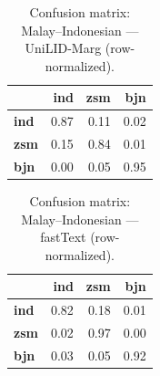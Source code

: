 \begin{table}[htbp]
\centering
\small
\begin{tabular}{lrrr}
\toprule
 & \textbf{ind} & \textbf{zsm} & \textbf{bjn} \\
\midrule
\textbf{ind} & \cellcolor{blue!87}\color{white}0.87 & \cellcolor{blue!10}0.11 & \cellcolor{blue!1}0.02 \\
\textbf{zsm} & \cellcolor{blue!14}0.15 & \cellcolor{blue!84}\color{white}0.84 & \cellcolor{blue!1}0.01 \\
\textbf{bjn} & \cellcolor{blue!0}0.00 & \cellcolor{blue!5}0.05 & \cellcolor{blue!95}\color{white}0.95 \\
\bottomrule
\end{tabular}
\caption{Confusion matrix: Malay--Indonesian — UniLID-Marg (row-normalized).}
\label{tab:cm-malay_indonesian-unilid-marg}
\end{table}

\begin{table}[htbp]
\centering
\small
\begin{tabular}{lrrr}
\toprule
 & \textbf{ind} & \textbf{zsm} & \textbf{bjn} \\
\midrule
\textbf{ind} & \cellcolor{blue!81}\color{white}0.82 & \cellcolor{blue!17}0.18 & \cellcolor{blue!0}0.01 \\
\textbf{zsm} & \cellcolor{blue!2}0.02 & \cellcolor{blue!97}\color{white}0.97 & \cellcolor{blue!0}0.00 \\
\textbf{bjn} & \cellcolor{blue!2}0.03 & \cellcolor{blue!5}0.05 & \cellcolor{blue!92}\color{white}0.92 \\
\bottomrule
\end{tabular}
\caption{Confusion matrix: Malay--Indonesian — fastText (row-normalized).}
\label{tab:cm-malay_indonesian-fasttext}
\end{table}